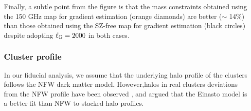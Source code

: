 Finally, a subtle point from the figure is that the mass constraints obtained using the 150 GHz map for gradient estimation
(orange diamonds) are better ($\sim$ 14\%) than those obtained using the SZ-free map for gradient estimation (black circles) despite adopting $\ell_{\rm G} = 2000$ in both cases.
 \subsubsection{Cluster profile}\label{subsec_clusprofile}
In our fiducial analysis, we assume that the underlying halo profile of the clusters follows the NFW dark matter model. 
However,halos in real clusters %
deviations from the NFW profile have been observed \citep[e.g.,][]{diemer14}, and 
\citet{child18} argued that the Einasto model is a better fit than NFW to stacked halo profiles.

